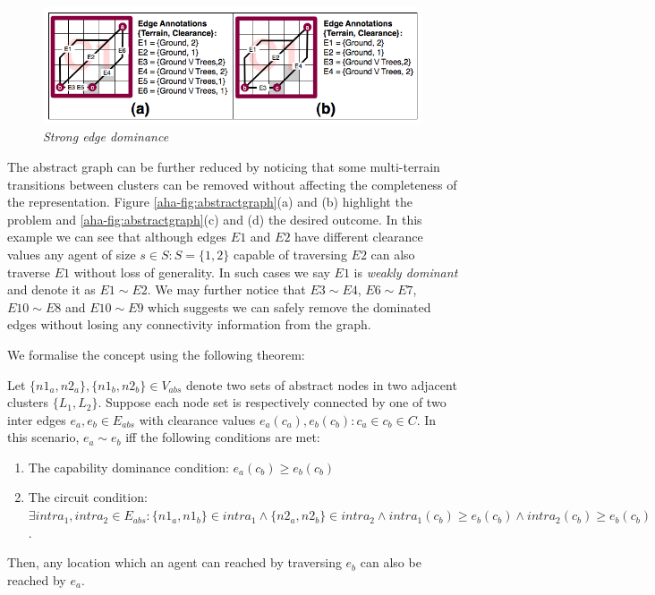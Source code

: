 \begin{figure}[htbp]
        \caption{\emph{Strong edge dominance} }
        \begin{center}
                        \includegraphics[scale=0.3]{diagrams/intraedges_initial.png}
        \end{center}
        \label{aha-fig:strongdominance}
\end{figure}

The abstract graph can be further reduced by noticing that some multi-terrain transitions between clusters can be removed without affecting the completeness of the representation. 
Figure \ref{aha-fig:abstractgraph}(a) and (b) highlight the problem and \ref{aha-fig:abstractgraph}(c) and (d) the desired outcome.
In this example we can see that although edges $E1$ and $E2$ have different clearance values any agent of size $s \in S : S = \lbrace 1, 2 \rbrace$ capable of traversing $E2$ can also traverse $E1$ without loss of generality. 
In such cases we say $E1$ is \emph{weakly dominant} and denote it as $E1 \sim E2$. 
We may further notice that $E3 \sim E4$, $E6 \sim E7$, $E10 \sim E8$ and $E10 \sim E9$ which suggests we can safely remove the dominated edges without losing any connectivity information from the graph. 

We formalise the concept using the following theorem:
\begin{theorem}
\label{aha-theorem:weakdominance}
Let $\lbrace n1_{a}, n2_{a} \rbrace, \lbrace n1_{b}, n2_{b} \rbrace \in V_{abs}$ denote two sets of abstract nodes in two adjacent clusters $\lbrace L_{1}, L_{2} \rbrace$. Suppose each node set is respectively connected by one of two inter edges $e_{a}, e_{b} \in E_{abs}$ with clearance values $e_{a}(c_{a}), e_{b}(c_{b})  : c_{a} \in c_{b} \in C$.
 In this scenario, $e_{a} \sim e_{b}$ iff the following conditions are met:
\begin{enumerate}
\item{The capability dominance condition: $e_{a}(c_{b}) \geq e_{b}(c_{b})$}
\item{The circuit condition: $\exists intra_{1}, intra_{2} \in E_{abs} : \lbrace n1_{a}, n1_{b} \rbrace \in intra_{1} \wedge \lbrace n2_{a}, n2_{b} \rbrace \in intra_{2} \wedge intra_{1}(c_{b}) \geq e_{b}(c_{b}) \wedge intra_{2}(c_{b}) \geq e_{b}(c_{b})$.}
\end{enumerate}
Then, any location which an agent can reached by traversing $e_{b}$ can also be reached by $e_{a}$.
\end{theorem}


